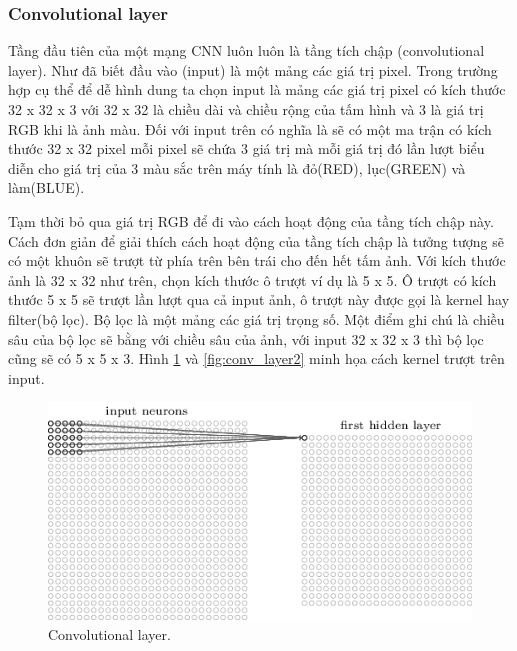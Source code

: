 	\subsubsection{Convolutional layer}
		Tầng đầu tiên của một mạng CNN luôn luôn là tầng tích chập (convolutional layer)\cite{conv}. Như đã biết đầu vào (input) là một mảng các giá trị pixel. Trong trường hợp cụ thể để dễ hình dung ta chọn input là mảng các giá trị pixel có kích thước 32 x 32 x 3 với 32 x 32 là chiều dài và chiều rộng của tấm hình và 3 là giá trị RGB khi là ảnh màu. Đối với input trên có nghĩa là sẽ có một ma trận có kích thước 32 x 32 pixel mỗi pixel sẽ chứa 3 giá trị mà mỗi giá trị đó lần lượt biểu diễn cho giá trị của 3 màu sắc trên máy tính là đỏ(RED), lục(GREEN) và làm(BLUE). \par
		Tạm thời bỏ qua giá trị RGB để đi vào cách hoạt động của tầng tích chập này. Cách đơn giản để giải thích cách hoạt động của tầng tích chập là tưởng tượng sẽ có một khuôn sẽ trượt từ phía trên bên trái cho đến hết tấm ảnh\cite{arch}. Với kích thước ảnh là 32 x 32 như trên, chọn kích thước ô trượt ví dụ là 5 x 5. Ô trượt có kích thước 5 x 5 sẽ trượt lần lượt qua cả input ảnh, ô trượt này được gọi là kernel hay filter(bộ lọc). Bộ lọc là một mảng các giá trị trọng số. Một điểm ghi chú là chiều sâu của bộ lọc sẽ bằng với chiều sâu của ảnh, với input 32 x 32 x 3 thì bộ lọc cũng sẽ có 5 x 5 x 3. Hình \ref{fig:conv_layer1} và \ref{fig:conv_layer2} minh họa cách kernel trượt trên input.
		\begin{figure}[h!]
			\centering
			\includegraphics[scale=0.9]{charts/conv_layer1.png}
			\caption{Convolutional layer.\cite{conv-layer}}
			\label{fig:conv_layer1}
		\end{figure}
		
